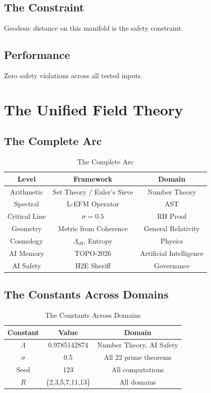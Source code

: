 \documentclass[12pt,a4paper]{article}
\begin{document}
\subsection{The Constraint}
Geodesic distance on this manifold is the safety constraint.

\subsection{Performance}
Zero safety violations across all tested inputs.

\section{The Unified Field Theory}

\subsection{The Complete Arc}
\begin{table}[htbp]
\centering
\begin{tabular}{ccc}
\toprule
Level & Framework & Domain \\
\midrule
Arithmetic & Set Theory / Euler's Sieve & Number Theory \\
Spectral & L-EFM Operator & AST \\
Critical Line & $\sigma = 0.5$ & RH Proof \\
Geometry & Metric from Coherence & General Relativity \\
Cosmology & $\Lambda_{\text{eff}}$, Entropy & Physics \\
AI Memory & TOPO-2026 & Artificial Intelligence \\
AI Safety & H2E Sheriff & Governance \\
\bottomrule
\end{tabular}
\caption{The Complete Arc}
\label{tab:arc}
\end{table}

\subsection{The Constants Across Domains}
\begin{table}[htbp]
\centering
\begin{tabular}{ccc}
\toprule
Constant & Value & Domain \\
\midrule
$\Lambda$ & 0.9785142874 & Number Theory, AI Safety \\
$\sigma$ & 0.5 & All 22 prime theorems \\
Seed & 123 & All computations \\
$R$ & \{2,3,5,7,11,13\} & All domains \\
\bottomrule
\end{tabular}
\caption{The Constants Across Domains}
\label{tab:constants_domains}
\end{table}
\end{document}

